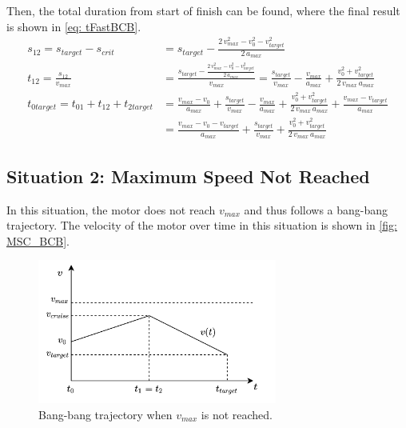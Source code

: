 \noindent Then, the total duration from start of finish can be found, where the final result is shown in \cref{eq: tFastBCB}. 
\begin{align}
    s_{12} = s_{target} - s_{crit}  &= s_{target} - \frac{2 \, v_{max}^2-v_0^2 - v_{target}^2}{2 \, a_{max}} \nonumber \\
    t_{12} = \frac{s_{12}}{v_{max}} &= \frac{s_{target} - \frac{2 \, v_{max}^2-v_0^2 - v_{target}^2}{2 \, a_{max}}}{v_{max}} = \frac{s_{target}}{v_{max}} - \frac{v_{max}}{a_{max}} + \frac{v_0^2 + v_{target}^2}{2\, v_{max} \, a_{max}} \nonumber \\
    t_{0target} = t_{01} + t_{12} + t_{2target} &= \frac{v_{max} - v_0}{a_{max}}+ \frac{s_{target}}{v_{max}} - \frac{v_{max}}{a_{max}} + \frac{v_0^2 + v_{target}^2}{2\, v_{max} \, a_{max}} + \frac{v_{max} - v_{target}}{a_{max}}\nonumber \\
    &= \frac{v_{max} - v_0 - v_{target}}{a_{max}}+ \frac{s_{target}}{v_{max}} + \frac{v_0^2 + v_{target}^2}{2\, v_{max} \, a_{max}} \label{eq: tFastBCB}
\end{align}

\newpage
\subsection{Situation 2: Maximum Speed Not Reached} \label{sub: MSC_speednotreached}
\noindent In this situation, the motor does not reach $v_{max}$ and thus follows a bang-bang trajectory. The velocity of the motor over time in this situation is shown in \cref{fig: MSC_BCB}.
\begin{figure}[H]
    \centering
    \includegraphics[width=0.7\textwidth]{figures/MotorSpeedCalculations/MSC_BB_trajectory.png}
    \caption{Bang-bang trajectory when $v_{max}$ is not reached.}
    \label{fig: MSC_BB}
\end{figure}

